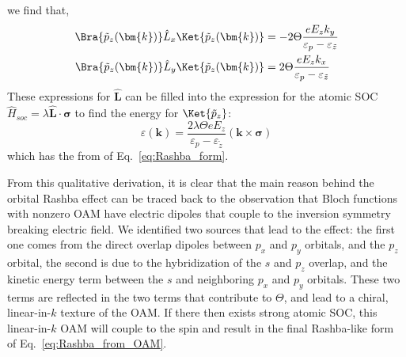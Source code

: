 we find that,
\begin{align}
	\label{eq:oam_from_k}
	\Bra{\tilde{p}_z(\bm{k})} \hat{L}_x \Ket{\tilde{p}_z(\bm{k})} &= - 2 \Theta \frac{e E_z k_y}{\varepsilon_p - \varepsilon_{\tilde{z}}}\\ 
	\Bra{\tilde{p}_z(\bm{k})} \hat{L}_y \Ket{\tilde{p}_z(\bm{k})} &= 2 \Theta \frac{e E_z k_x}{\varepsilon_p - \varepsilon_{\tilde{z}}} 
\end{align}
These expressions for $\hat{\bm{L}}$ can be filled into the expression for the atomic SOC $\hat{H}_{soc}= \lambda \hat{\bm{L}} \cdot \hat{\bm{\sigma}}$ to find the energy for $\Ket{\tilde{p}_z}$:
\begin{equation}
	\label{eq:Rashba_from_OAM}
	\varepsilon(\bm{k}) = \frac{2 \lambda \Theta e E_z}{\varepsilon_p - \varepsilon_{\tilde{z}}}(\bm{k} \times \bm{\sigma})
\end{equation}
which has the from of Eq.~\ref{eq:Rashba_form}.

From this qualitative derivation, it is clear that the main reason behind the orbital Rashba effect can be traced back to the observation that Bloch functions with nonzero OAM have electric dipoles that couple to the inversion symmetry breaking electric field. We identified two sources that lead to the effect: the first one comes from the direct overlap dipoles between $p_x$ and $p_y$ orbitals, and the $p_z$ orbital\cite{Petersen2000}, the second is due to the hybridization of the $s$ and $p_z$ overlap, and the kinetic energy term between the $s$ and neighboring $p_x$ and $p_y$ orbitals\cite{Go2016}. These two terms are reflected in the two terms that contribute to $\Theta$, and lead to a chiral, linear-in-$k$ texture of the OAM.
If there then exists strong atomic SOC, this linear-in-$k$ OAM will couple to the spin and result in the final Rashba-like form of Eq.~\ref{eq:Rashba_from_OAM}.

